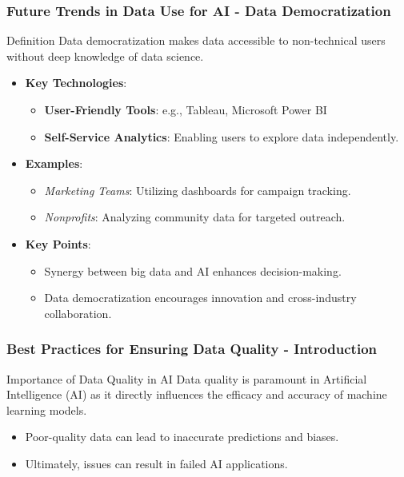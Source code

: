 \documentclass[aspectratio=169]{beamer}
\begin{document}
\begin{frame}[fragile]
    \frametitle{Future Trends in Data Use for AI - Data Democratization}
    \begin{block}{Definition}
        Data democratization makes data accessible to non-technical users without deep knowledge of data science.
    \end{block}
    \begin{itemize}
        \item \textbf{Key Technologies}:
        \begin{itemize}
            \item \textbf{User-Friendly Tools}: e.g., Tableau, Microsoft Power BI
            \item \textbf{Self-Service Analytics}: Enabling users to explore data independently.
        \end{itemize}
        \item \textbf{Examples}:
        \begin{itemize}
            \item \textit{Marketing Teams}: Utilizing dashboards for campaign tracking.
            \item \textit{Nonprofits}: Analyzing community data for targeted outreach.
        \end{itemize}
        \item \textbf{Key Points}:
        \begin{itemize}
            \item Synergy between big data and AI enhances decision-making.
            \item Data democratization encourages innovation and cross-industry collaboration.
        \end{itemize}
    \end{itemize}
\end{frame}

\begin{frame}[fragile]
    \frametitle{Best Practices for Ensuring Data Quality - Introduction}
    \begin{block}{Importance of Data Quality in AI}
        Data quality is paramount in Artificial Intelligence (AI) as it directly influences the efficacy and accuracy of machine learning models. 
        \begin{itemize}
            \item Poor-quality data can lead to inaccurate predictions and biases.
            \item Ultimately, issues can result in failed AI applications.
        \end{itemize}
    \end{block}
\end{frame}
\end{document}
